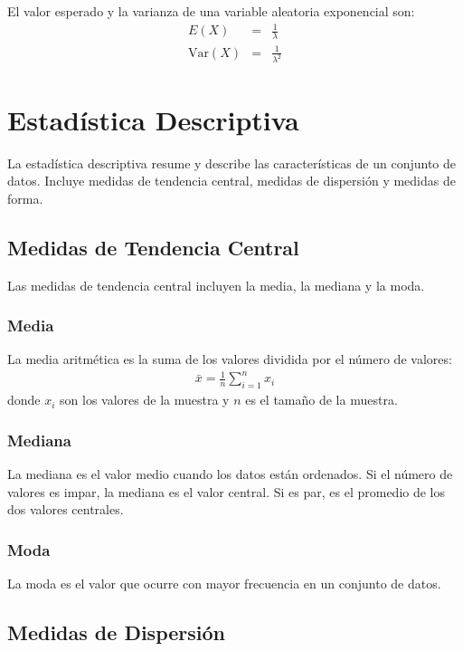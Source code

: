 El valor esperado y la varianza de una variable aleatoria exponencial son:
\begin{eqnarray*}
E(X) &=& \frac{1}{\lambda} \\
\text{Var}(X) &=& \frac{1}{\lambda^2}
\end{eqnarray*}

\section{Estad\'istica Descriptiva}

La estad\'istica descriptiva resume y describe las caracter\'isticas de un conjunto de datos. Incluye medidas de tendencia central, medidas de dispersi\'on y medidas de forma.

\subsection{Medidas de Tendencia Central}

Las medidas de tendencia central incluyen la media, la mediana y la moda.

\subsubsection{Media}

La media aritm\'etica es la suma de los valores dividida por el n\'umero de valores:
\begin{eqnarray*}
\bar{x} = \frac{1}{n} \sum_{i=1}^{n} x_i
\end{eqnarray*}
donde $x_i$ son los valores de la muestra y $n$ es el tama\~no de la muestra.

\subsubsection{Mediana}

La mediana es el valor medio cuando los datos est\'an ordenados. Si el n\'umero de valores es impar, la mediana es el valor central. Si es par, es el promedio de los dos valores centrales.

\subsubsection{Moda}

La moda es el valor que ocurre con mayor frecuencia en un conjunto de datos.

\subsection{Medidas de Dispersi\'on}

